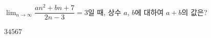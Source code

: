 $\displaystyle\lim_{n\to\infty}\dfrac{an^2+bn+7}{2n-3}=3$일 때, 상수 $a$, $b$에 대하여 $a+b$의 값은?
\begin{choices32}{$3$}{$4$}{$5$}{$6$}{$7$}\end{choices32}
